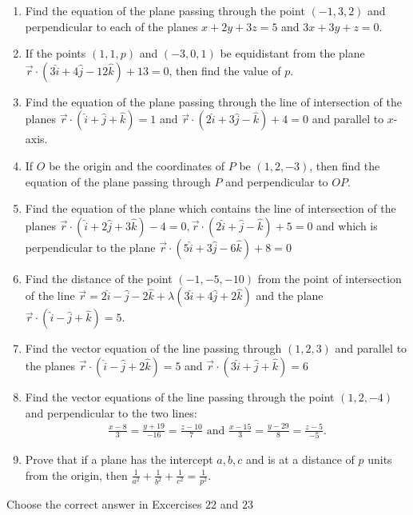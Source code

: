 \documentclass{article}
\theoremstyle{remark}
\begin{document}
\begin{enumerate}
\item Find the equation of the plane passing through the point $(-1,3,2)$ and perpendicular to each of the planes $x+2y+3z=5$ and $3x+3y+z=0$.
\item If the points $(1,1,p)$ and $(-3,0,1)$ be equidistant from the plane $\overrightarrow{r}\cdot(3\hat{i}+4\hat{j}-12\hat{k})+13=0$, then find the value of $p$.
\item Find the equation of the plane passing through the line of intersection of the planes  $\overrightarrow{r}\cdot(\hat{i}+\hat{j}+\hat{k})=1$ and $\overrightarrow{r}\cdot(2\hat{i}+3\hat{j}-\hat{k})+4=0$ and parallel to $x$-axis.
\item If $O$ be the origin and the coordinates of $P$ be $(1,2,-3)$, then find the equation of the plane passing through $P$ and perpendicular to $OP$.
\item Find the equation of the plane which contains the line of intersection of the planes $\overrightarrow{r}\cdot(\hat{i}+2\hat{j}+3\hat{k})-4=0, \overrightarrow{r} \cdot  (2\hat{i}+\hat{j}-\hat{k})+5=0$ and which is perpendicular to the plane $\overrightarrow{r}\cdot(5\hat{i}+3\hat{j}-6\hat{k})+8=0$
\item Find the distance of the point $(-1,-5,-10)$ from the point of intersection of the line $\overrightarrow{r}=2\hat{i}-\hat{j}-2\hat{k}+\lambda(3\hat{i}+4\hat{j}+2\hat{k})$ and the plane $\overrightarrow{r}\cdot(\hat{i}-\hat{j}+\hat{k})=5$.
\item Find the vector equation of the line passing through $(1,2,3)$ and parallel to the planes $\overrightarrow{r} \cdot (\hat{i}-\hat{j}+2\hat{k})=5$ and $\overrightarrow{r} \cdot (3\hat{i}+\hat{j}+\hat{k})=6$ 
\item Find the vector equations of the line passing through the point $(1,2,-4)$ and perpendicular to the two lines:
\begin{align}
\frac{x-8}{3}=\frac{y+19}{-16}=\frac{z-10}{7}\text{ and } \frac{x-15}{3}=\frac{y-29}{8}=\frac{z-5}{-5}.
\end{align}
\item Prove that if a plane has the intercept $a,b,c$ and is at a distance of $p$ units  from the origin, then $\frac{1}{a^2}+\frac{1}{b^2}+\frac{1}{c^2}=\frac{1}{p^2}.$
\end{enumerate}
Choose the correct answer in Excercises $22$ and $23$
\end{document}
